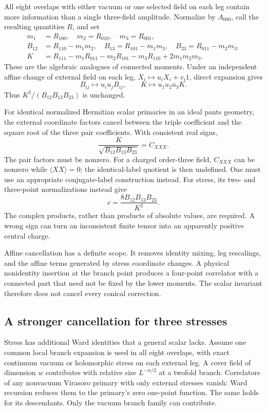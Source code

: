 All eight overlaps with either vacuum or one selected field on each
leg contain more information than a single three-field amplitude.
Normalize by $A_{000}$, call the resulting quantities $R$, and set
\begin{align*}
 m_1&=R_{100},\quad m_2=R_{010},\quad m_3=R_{001},\\
 B_{12}&=R_{110}-m_1m_2,
 \quad B_{13}=R_{101}-m_1m_3,
 \quad B_{23}=R_{011}-m_2m_3,\\
 K&=R_{111}-m_1R_{011}-m_2R_{101}-m_3R_{110}
       +2m_1m_2m_3.
\end{align*}
These are the algebraic analogues of connected moments. Under an
independent affine change of external field on each leg,
$X_i\mapsto u_iX_i+v_i1$, direct expansion gives
\[
 B_{ij}\mapsto u_iu_jB_{ij},\qquad
 K\mapsto u_1u_2u_3K.
\]
Thus $K^2/(B_{12}B_{13}B_{23})$ is unchanged.

For identical normalized Hermitian scalar primaries in an ideal pants geometry,
the external coordinate factors cancel between the triple coefficient
and the square root of the three pair coefficients. With consistent
real signs,
\[
 \frac{K}{\sqrt{B_{12}B_{13}B_{23}}}=C_{XXX}.
\]
The pair factors must be nonzero. For a charged order-three field,
$C_{XXX}$ can be nonzero while $\langle XX\rangle=0$; the
identical-label quotient is then undefined. One must use an
appropriate conjugate-label construction instead.
For stress, its two- and three-point normalizations instead give
\begin{equation}
 c=\frac{8B_{12}B_{13}B_{23}}{K^2}.
 \label{eq:connected-stress-c}
\end{equation}
The complex products, rather than products of absolute values, are
required. A wrong sign can turn an inconsistent finite tensor into an
apparently positive central charge.

Affine cancellation has a definite scope. It removes identity mixing,
leg rescalings, and the affine terms generated by stress coordinate
changes. A physical nonidentity insertion at the branch point produces
a four-point correlator with a connected part that need not be fixed
by the lower moments. The scalar invariant therefore does not cancel
every conical correction.

\subsection{A stronger cancellation for three stresses}

Stress has additional Ward identities that a general scalar lacks.
Assume one common local branch expansion is used in all eight
overlaps, with exact continuum vacuum or holomorphic stress on
each external leg. A cover field of dimension $w$ contributes with
relative size $L^{-w/2}$ at a twofold branch. Correlators of any
nonvacuum Virasoro primary with only external stresses vanish:
Ward recursion reduces them to the primary's zero one-point
function. The same holds for its descendants. Only the vacuum
branch family can contribute.

